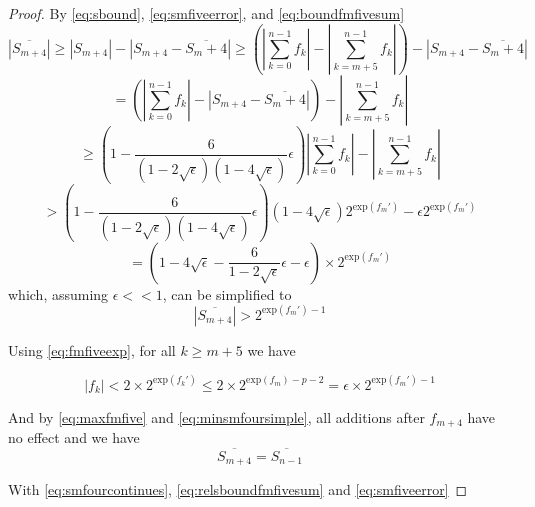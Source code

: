 \documentclass[12pt]{article}
\providecommand{\exp}{\ensuremath{\text{exp}}}
\theoremstyle{definition}
\numberwithin{equation}{section}
\numberwithin{figure}{section}
\begin{document}
\begin{proof}
      By  \eqref{eq:sbound}, \eqref{eq:smfiveerror}, and \eqref{eq:boundfmfivesum}
        \begin{equation*}
          |\overline{S_{m + 4}}| \geq |S_{m + 4}| - |S_{m + 4} - \overline{S_m + 4}| \geq (|\sum\limits_{k = 0}^{n - 1} f_k| - |\sum\limits_{k = m + 5}^{n - 1}f_k|) - |S_{m + 4} - \overline{S_m + 4}|
        \end{equation*}
        \begin{equation*}
           = (|\sum\limits_{k = 0}^{n - 1} f_k| - |S_{m + 4} - \overline{S_m + 4}|) - |\sum\limits_{k = m + 5}^{n - 1}f_k|
        \end{equation*}
        \begin{equation*}
           \geq (1 - \frac{6}{(1 - 2\sqrt\epsilon)(1 - 4\sqrt\epsilon)}\epsilon)|\sum\limits_{k = 0}^{n - 1} f_k| - |\sum\limits_{k = m + 5}^{n - 1}f_k|
        \end{equation*}
        \begin{equation*}
           > (1 - \frac{6}{(1 - 2\sqrt\epsilon)(1 - 4\sqrt\epsilon)}\epsilon)(1 - 4 \sqrt\epsilon)2^{\exp(f_m')} - \epsilon2^{\exp(f_m')}
        \end{equation*}
        \begin{equation}
          = (1 - 4\sqrt\epsilon - \frac{6}{1 - 2\sqrt\epsilon}\epsilon - \epsilon )\times 2^{\exp(f_m')}
        \end{equation}
        which, assuming $\epsilon << 1$, can be simplified to
        \begin{equation}
          |\overline{S_{m + 4}}| > 2^{\exp(f_m') - 1}
          \label{eq:minsmfoursimple}
        \end{equation}

        Using  \eqref{eq:fmfiveexp}, for all $k \geq m + 5$ we have

        \begin{equation}
          |f_k| < 2 \times 2^{\exp(f_k')} \leq 2 \times 2^{\exp(f_m) - p - 2} = \epsilon \times 2^{\exp(f_m') - 1}
          \label{eq:maxfmfive}
        \end{equation}

        And by  \eqref{eq:maxfmfive} and \eqref{eq:minsmfoursimple}, all additions after $f_{m + 4}$ have no effect and we have
        \begin{equation}
          \overline{S_{m + 4}} = \overline{S_{n - 1}}
          \label{eq:smfourcontinues}
        \end{equation}

        With  \eqref{eq:smfourcontinues}, \eqref{eq:relsboundfmfivesum} and \eqref{eq:smfiveerror}


\end{proof}
\end{document}
